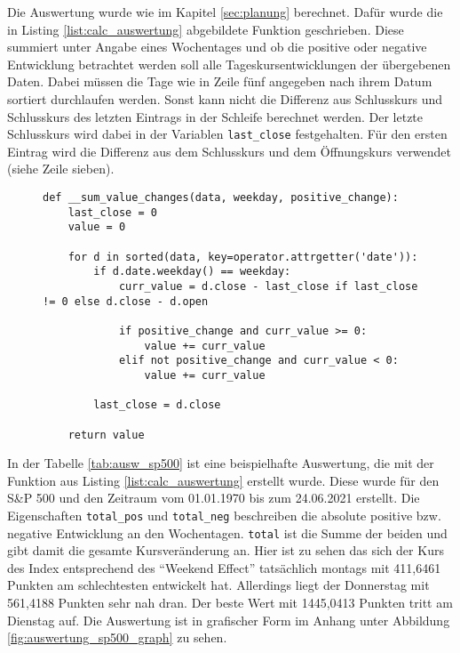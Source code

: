 Die Auswertung wurde wie im Kapitel \cref{sec:planung} berechnet. Dafür wurde die in Listing \ref{list:calc_auswertung} abgebildete Funktion geschrieben. Diese summiert unter Angabe eines Wochentages und ob die positive oder negative Entwicklung betrachtet werden soll alle Tageskursentwicklungen der übergebenen Daten. Dabei müssen die Tage wie in Zeile fünf angegeben nach ihrem Datum sortiert durchlaufen werden. Sonst kann nicht die Differenz aus Schlusskurs und Schlusskurs des letzten Eintrags in der Schleife berechnet werden. Der letzte Schlusskurs wird dabei in der Variablen \texttt{last\_close} festgehalten. Für den ersten Eintrag wird die Differenz aus dem Schlusskurs und dem Öffnungskurs verwendet (siehe Zeile sieben).

\begin{figure}[!htb]
    \begin{lstlisting}[caption=Berechnung der Kursentwicklung nach Wochentag, label=list:calc_auswertung]
def __sum_value_changes(data, weekday, positive_change):
    last_close = 0
    value = 0

    for d in sorted(data, key=operator.attrgetter('date')):
        if d.date.weekday() == weekday:
            curr_value = d.close - last_close if last_close != 0 else d.close - d.open

            if positive_change and curr_value >= 0:
                value += curr_value
            elif not positive_change and curr_value < 0:
                value += curr_value

        last_close = d.close

    return value
    \end{lstlisting}
\end{figure}

In der Tabelle \ref{tab:ausw_sp500} ist eine beispielhafte Auswertung, die mit der Funktion aus Listing \ref{list:calc_auswertung} erstellt wurde. Diese wurde für den S\&P 500 und den Zeitraum vom 01.01.1970 bis zum 24.06.2021 erstellt. Die Eigenschaften \texttt{total\_pos} und \texttt{total\_neg} beschreiben die absolute positive bzw. negative Entwicklung an den Wochentagen. \texttt{total} ist die Summe der beiden und gibt damit die gesamte Kursveränderung an. Hier ist zu sehen das sich der Kurs des Index entsprechend des \enquote{Weekend Effect} tatsächlich montags mit 411,6461 Punkten am schlechtesten entwickelt hat. Allerdings liegt der Donnerstag mit 561,4188 Punkten sehr nah dran. Der beste Wert mit 1445,0413 Punkten tritt am Dienstag auf. Die Auswertung ist in grafischer Form im Anhang unter Abbildung \ref{fig:auswertung_sp500_graph} zu sehen.

